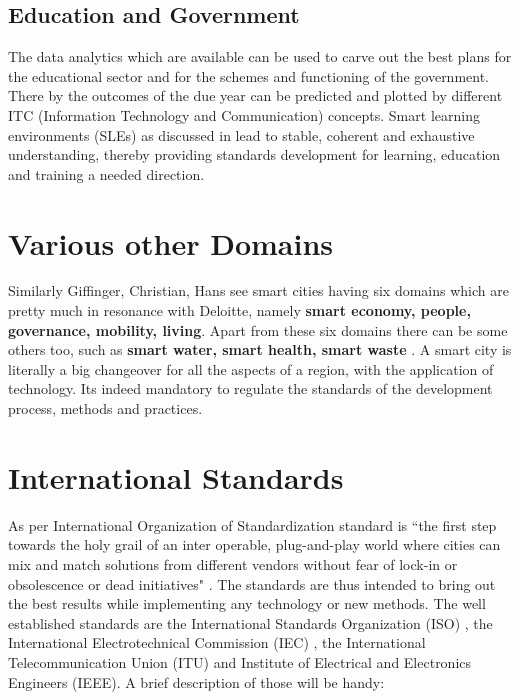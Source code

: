 \documentclass[sigconf]{acmart}
\begin{document}
\subsection{Education and Government}
The data analytics which are available can be used to carve out the best plans for the educational sector and for the schemes and functioning of the government. There by the outcomes of the due year can be predicted and plotted by different ITC (Information Technology and Communication) concepts. Smart learning environments (SLEs) as discussed in \citep{hoel2018standards} lead to stable, coherent and exhaustive understanding, thereby providing standards development for learning, education and training a needed direction.
\section{Various other Domains}
Similarly \citep{giffinger2007smart} Giffinger, Christian, Hans see smart cities  having six domains which are pretty much in resonance with Deloitte, namely \textbf{smart economy, people, governance, mobility, living}.
Apart from these six domains there can be some others too, such as \textbf{smart water, smart health, smart waste} \citep{lai2020review}. A smart city is literally a big changeover for all the aspects of a region, with the application of technology. Its indeed mandatory to regulate the standards of the development process, methods and practices.
\section{International Standards}
 As per International Organization of Standardization standard is “the first step towards the holy grail of an inter operable, plug-and-play world where cities can mix and match solutions from different vendors without fear of lock-in or obsolescence or dead initiatives" \citep{whataresmartcities}. The standards are thus intended to bring out the best results while implementing any technology or new methods. 
The well established standards are the International Standards Organization (ISO) \citep{whataresmartcities}, the International Electrotechnical Commission (IEC) \citep{IEC}, the International Telecommunication Union (ITU) \citep{ITU} and Institute of Electrical and Electronics Engineers (IEEE). A brief description of those will be handy:
\end{document}
